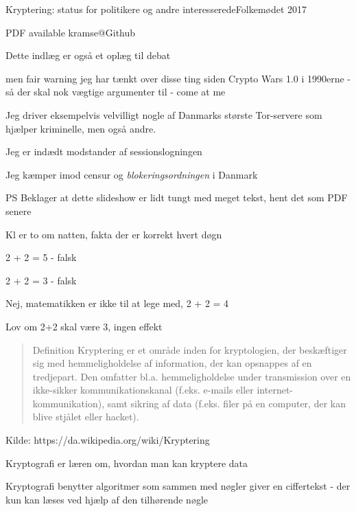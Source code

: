 \documentclass[20pt,landscape,a4paper,footrule]{foils}
\begin{document}

\mytitlepage
{Kryptering: status for politikere og andre interesserede}{Folkemødet 2017}

\centerline{\footnotesize
 PDF available kramse@Github}

\LogoOn

%


Dette indlæg er også et oplæg til debat

men fair warning jeg har tænkt over disse ting siden Crypto Wars
1.0 i 1990erne
- så der skal nok vægtige argumenter til - come at me \smiley

Jeg driver eksempelvis velvilligt nogle af Danmarks største Tor-servere
som hjælper kriminelle, men også andre.

Jeg er indædt modstander af sessionslogningen

Jeg kæmper imod censur og \emph{blokeringsordningen} i Danmark

PS Beklager at dette slideshow er lidt tungt med meget tekst, hent det som PDF senere

Kl er to om natten, fakta der er korrekt hvert døgn

2 + 2 = 5 - falsk

2 + 2 = 3 - falsk

Nej, matematikken er ikke til at lege med, 2 + 2 = 4

Lov om 2+2 skal være 3, ingen effekt



\begin{quote}
Definition
Kryptering er et område inden for kryptologien, der beskæftiger sig med
hemmeligholdelse af information, der kan opsnappes af en tredjepart. Den
omfatter bl.a. hemmeligholdelse under transmission over en ikke-sikker
kommunikationskanal (f.eks. e-mails eller internet-kommunikation), samt
sikring af data (f.eks. filer på en computer, der kan blive stjålet eller hacket).
\end{quote}
Kilde: https://da.wikipedia.org/wiki/Kryptering



\begin{list1}
\item Kryptografi er læren om, hvordan man kan kryptere data
\item Kryptografi benytter algoritmer som sammen med nøgler giver en
  ciffertekst - der kun kan læses ved hjælp af den tilhørende nøgle
\end{list1}
\end{document}
